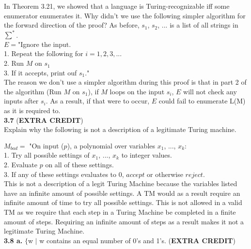 \documentclass[12pt]{article}
\newcommand\tab[1][1cm]{\hspace*{#1}}
\begin{document}
In Theorem 3.21, we showed that a language is Turing-recognizable iff some 
enumerator enumerates it. Why didn’t we use the following simpler algorithm for the
forward direction of the proof? As before, $s_1$, $s_2$, ... is a list of all strings in $\sum^*$. \\

$E = $"Ignore the input. \\
\tab 1. Repeat the following for $i = 1, 2, 3, ...$ \\
\tab 2. Run $M$ on $s_1$ \\
\tab 3. If it accepts, print ouf $s_1$." \\

The reason we don't use a simpler algorithm during this proof is that in part 2 
of the algorithm (Run $M$ on $s_1$), if $M$ loops on the input $s_i$, $E$ will not 
check any inputs after $s_i$. As a result, if that were to occur, $E$ could fail to
enumerate L(M) as it is required to. \\

\textbf{3.7} (\textbf{EXTRA CREDIT}) \\

Explain why the following is not a description of a legitimate Turing machine.

$M_{bad} =$ "On input ($p$), a polynomial over variables $x_1$, ..., $x_k$: \\
\tab 1. Try all possible settings of $x_1$, ..., $x_k$ to integer values. \\
\tab 2. Evaluate $p$ on all of these settings. \\
\tab 3. If any of these settings evaluates to 0, $accept$ or otherwise $reject$. \\

This is not a description of a legit Turing Machine because the variables listed
have an infinite amount of possible settings. A TM would as a result require an
infinite amount of time to try all possible settings. This is not allowed in a
valid TM as we require that each step in a Turing Machine be completed in a finite
amount of steps. Requiring an infinite amount of steps as a result makes it not
a legitimate Turing Machine. \\

\pagebreak
\textbf{3.8 a.} $\{$w $\mid$ w contains an equal number of 0's and 1's.
(\textbf{EXTRA CREDIT})  \\
\end{document}
